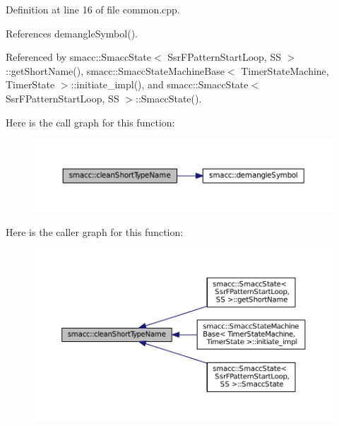 Definition at line 16 of file common.\+cpp.



References demangle\+Symbol().



Referenced by smacc\+::\+Smacc\+State$<$ Ssr\+F\+Pattern\+Start\+Loop, S\+S $>$\+::get\+Short\+Name(), smacc\+::\+Smacc\+State\+Machine\+Base$<$ Timer\+State\+Machine, Timer\+State $>$\+::initiate\+\_\+impl(), and smacc\+::\+Smacc\+State$<$ Ssr\+F\+Pattern\+Start\+Loop, S\+S $>$\+::\+Smacc\+State().




Here is the call graph for this function\+:
\nopagebreak
\begin{figure}[H]
\begin{center}
\leavevmode
\includegraphics[width=350pt]{namespacesmacc_a09b297b1cdb9aae93a958f323431464a_cgraph}
\end{center}
\end{figure}




Here is the caller graph for this function\+:
\nopagebreak
\begin{figure}[H]
\begin{center}
\leavevmode
\includegraphics[width=350pt]{namespacesmacc_a09b297b1cdb9aae93a958f323431464a_icgraph}
\end{center}
\end{figure}


